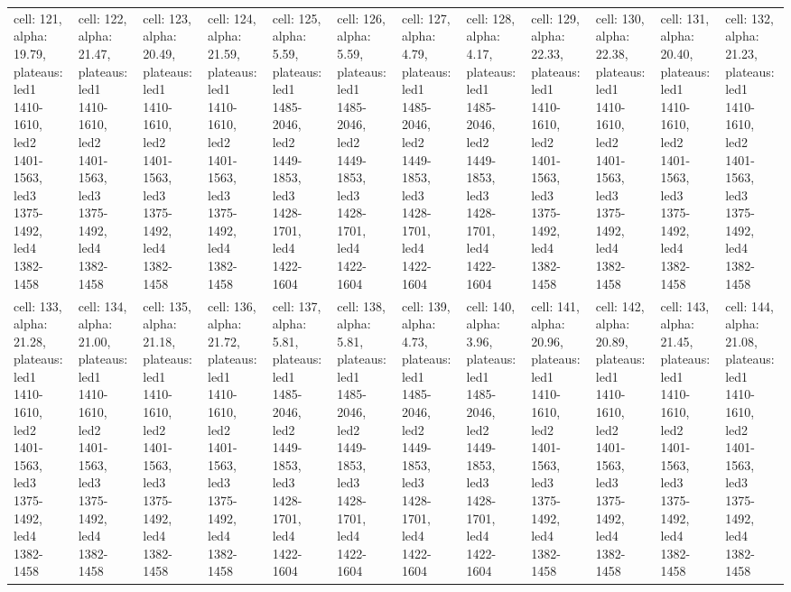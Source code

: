 \documentclass{article}
\begin{document}
\begin{landscape}
\begin{longtable}{|p{1.5cm}|p{1.5cm}|p{1.5cm}|p{1.5cm}|p{1.5cm}|p{1.5cm}|p{1.5cm}|p{1.5cm}|p{1.5cm}|p{1.5cm}|p{1.5cm}|p{1.5cm}|}
\rowcolor{lightgray} cell: 121, alpha: 19.79, plateaus: led1 1410-1610, led2 1401-1563, led3 1375-1492, led4 1382-1458 &cell: 122, alpha: 21.47, plateaus: led1 1410-1610, led2 1401-1563, led3 1375-1492, led4 1382-1458 &cell: 123, alpha: 20.49, plateaus: led1 1410-1610, led2 1401-1563, led3 1375-1492, led4 1382-1458 &cell: 124, alpha: 21.59, plateaus: led1 1410-1610, led2 1401-1563, led3 1375-1492, led4 1382-1458 &cell: 125, alpha: 5.59, plateaus: led1 1485-2046, led2 1449-1853, led3 1428-1701, led4 1422-1604 &cell: 126, alpha: 5.59, plateaus: led1 1485-2046, led2 1449-1853, led3 1428-1701, led4 1422-1604 &cell: 127, alpha: 4.79, plateaus: led1 1485-2046, led2 1449-1853, led3 1428-1701, led4 1422-1604 &cell: 128, alpha: 4.17, plateaus: led1 1485-2046, led2 1449-1853, led3 1428-1701, led4 1422-1604 &cell: 129, alpha: 22.33, plateaus: led1 1410-1610, led2 1401-1563, led3 1375-1492, led4 1382-1458 &cell: 130, alpha: 22.38, plateaus: led1 1410-1610, led2 1401-1563, led3 1375-1492, led4 1382-1458 &cell: 131, alpha: 20.40, plateaus: led1 1410-1610, led2 1401-1563, led3 1375-1492, led4 1382-1458 &cell: 132, alpha: 21.23, plateaus: led1 1410-1610, led2 1401-1563, led3 1375-1492, led4 1382-1458 \\
cell: 133, alpha: 21.28, plateaus: led1 1410-1610, led2 1401-1563, led3 1375-1492, led4 1382-1458 &cell: 134, alpha: 21.00, plateaus: led1 1410-1610, led2 1401-1563, led3 1375-1492, led4 1382-1458 &cell: 135, alpha: 21.18, plateaus: led1 1410-1610, led2 1401-1563, led3 1375-1492, led4 1382-1458 &cell: 136, alpha: 21.72, plateaus: led1 1410-1610, led2 1401-1563, led3 1375-1492, led4 1382-1458 &cell: 137, alpha: 5.81, plateaus: led1 1485-2046, led2 1449-1853, led3 1428-1701, led4 1422-1604 &cell: 138, alpha: 5.81, plateaus: led1 1485-2046, led2 1449-1853, led3 1428-1701, led4 1422-1604 &cell: 139, alpha: 4.73, plateaus: led1 1485-2046, led2 1449-1853, led3 1428-1701, led4 1422-1604 &cell: 140, alpha: 3.96, plateaus: led1 1485-2046, led2 1449-1853, led3 1428-1701, led4 1422-1604 &cell: 141, alpha: 20.96, plateaus: led1 1410-1610, led2 1401-1563, led3 1375-1492, led4 1382-1458 &cell: 142, alpha: 20.89, plateaus: led1 1410-1610, led2 1401-1563, led3 1375-1492, led4 1382-1458 &cell: 143, alpha: 21.45, plateaus: led1 1410-1610, led2 1401-1563, led3 1375-1492, led4 1382-1458 &cell: 144, alpha: 21.08, plateaus: led1 1410-1610, led2 1401-1563, led3 1375-1492, led4 1382-1458 \\

\end{longtable}
\end{landscape}
\end{document}
